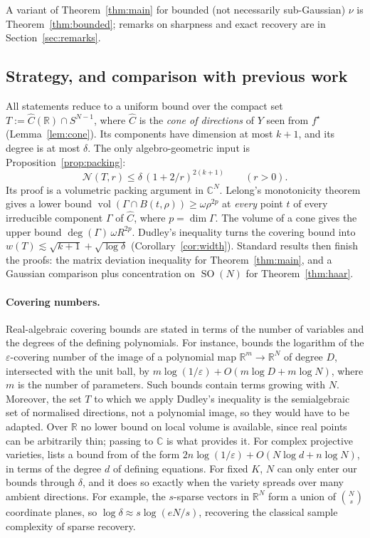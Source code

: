 \documentclass[11pt]{article}
\theoremstyle{definition}
\numberwithin{equation}{section}
\newcommand{\R}{\mathbb{R}}
\newcommand{\C}{\mathbb{C}}
\newcommand{\eps}{\varepsilon}
\newcommand{\fs}{f^{\star}}
\newcommand{\Ch}{\widehat{C}}
\newcommand{\cN}{\mathcal{N}}
\DeclareMathOperator{\vol}{vol}
\DeclareMathOperator{\SO}{SO}
\begin{document}
A variant of Theorem~\ref{thm:main} for bounded (not necessarily sub-Gaussian) $\nu$ is Theorem~\ref{thm:bounded}; remarks on sharpness and exact recovery are in Section~\ref{sec:remarks}.

\subsection{Strategy, and comparison with previous work}\label{sec:strategy}

All statements reduce to a uniform bound over the compact set $T:=\Ch(\R)\cap S^{N-1}$, where $\Ch$ is the \emph{cone of directions} of $Y$ seen from $\fs$ (Lemma~\ref{lem:cone}). Its components have dimension at most $k+1$, and its degree is at most $\delta$. The only algebro-geometric input is Proposition~\ref{prop:packing}:
\[
\cN(T,r)\le\delta\,(1+2/r)^{2(k+1)}\qquad(r>0).
\]
Its proof is a volumetric packing argument in $\C^N$. Lelong's monotonicity theorem gives a lower bound $\vol(\Gamma\cap B(t,\rho))\ge\omega\rho^{2p}$ at \emph{every} point $t$ of every irreducible component $\Gamma$ of $\Ch$, where $p=\dim\Gamma$. The volume of a cone gives the upper bound $\deg(\Gamma)\,\omega R^{2p}$. Dudley's inequality turns the covering bound into $w(T)\lesssim\sqrt{k+1}+\sqrt{\log\delta}$ (Corollary~\ref{cor:width}). Standard results then finish the proofs: the matrix deviation inequality for Theorem~\ref{thm:main}, and a Gaussian comparison plus concentration on $\SO(N)$ for Theorem~\ref{thm:haar}.

\paragraph{Covering numbers.} Real-algebraic covering bounds \cite{YomdinComte,ZhangKileel} are stated in terms of the number of variables and the degrees of the defining polynomials. For instance, \cite[Table~1]{ZhangKileel} bounds the logarithm of the $\eps$-covering number of the image of a polynomial map $\R^m\to\R^N$ of degree $D$, intersected with the unit ball, by $m\log(1/\eps)+O(m\log D+m\log N)$, where $m$ is the number of parameters. Such bounds contain terms growing with $N$. Moreover, the set $T$ to which we apply Dudley's inequality is the semialgebraic set of normalised directions, not a polynomial image, so they would have to be adapted. Over $\R$ no lower bound on local volume is available, since real points can be arbitrarily thin; passing to $\C$ is what provides it. For complex projective varieties, \cite[Table~1]{ZhangKileel} lists a bound from \cite{BurgisserCucker} of the form $2n\log(1/\eps)+O(N\log d+n\log N)$, in terms of the degree $d$ of defining equations. For fixed $K$, $N$ can only enter our bounds through $\delta$, and it does so exactly when the variety spreads over many ambient directions. For example, the $s$-sparse vectors in $\R^N$ form a union of $\binom Ns$ coordinate planes, so $\log\delta\approx s\log(eN/s)$, recovering the classical sample complexity of sparse recovery.
\end{document}
